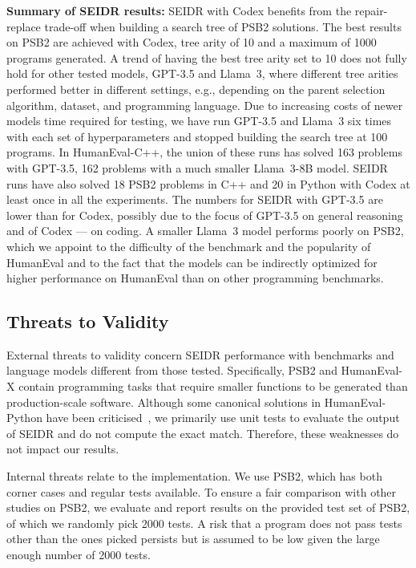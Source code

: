 \begin{highlight}
\textbf{Summary of SEIDR results:} 
SEIDR with Codex benefits from the repair-replace trade-off when building a search tree of PSB2 solutions. The best results on PSB2 are achieved with Codex, tree arity of 10 and a maximum of 1000 programs generated. A trend of having the best tree arity set to 10 does not fully hold for other tested models, GPT-3.5 and Llama~3, where different tree arities performed better in different settings, e.g., depending on the parent selection algorithm, dataset, and programming language. 
Due to increasing costs of newer models time required for testing, we have run GPT-3.5 and Llama~3 six times with each set of hyperparameters and stopped building the search tree at 100 programs. 
In HumanEval-C++, the union of these runs has solved 163 problems with GPT-3.5, 162 problems with a much smaller Llama~3-8B model.
SEIDR runs have also solved 18 PSB2 problems in C++ and 20 in Python with Codex at least once in all the experiments. 
The numbers for SEIDR with GPT-3.5 are lower than for Codex, possibly due to the focus of GPT-3.5 on general reasoning and of Codex --- on coding.
A smaller Llama~3 model performs poorly on PSB2, which we appoint to the difficulty of the benchmark and the popularity of HumanEval and to the fact that the models can be indirectly optimized for higher performance on HumanEval than on other programming benchmarks.
\end{highlight}


\subsection{Threats to Validity}
\label{sec:seidr-threats}

External threats to validity concern SEIDR performance with benchmarks and language models different from those tested. 
Specifically, PSB2 and HumanEval-X contain programming tasks that require smaller functions to be generated than production-scale software.
Although some canonical solutions in HumanEval-Python have been criticised~\cite{liuYourCodeGenerated2023}, we primarily use unit tests to evaluate the output of SEIDR and do not compute the exact match. Therefore, these weaknesses do not impact our results.

Internal threats relate to the implementation.
We use PSB2, which has both corner cases and regular tests available. 
To ensure a fair comparison with other studies on PSB2, we evaluate and report results on the provided test set of PSB2, of which we randomly pick 2000 tests. 
A risk that a program does not pass tests other than the ones picked persists but is assumed to be low given the large enough number of 2000 tests. 

